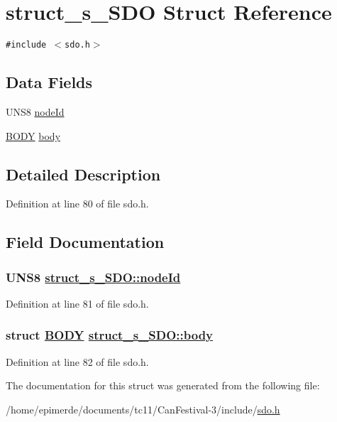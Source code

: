 \hypertarget{structstruct__s__SDO}{
\section{struct\_\-s\_\-SDO Struct Reference}
\label{structstruct__s__SDO}
}
{\tt \#include $<$sdo.h$>$}

\subsection*{Data Fields}
\begin{CompactItemize}
\item 
UNS8 \hyperlink{structstruct__s__SDO_bc72f84dbb51c6eb92ff44ac68e18ed5}{node\-Id}
\item 
\hyperlink{structBODY}{BODY} \hyperlink{structstruct__s__SDO_d24ba4940b125535e1d4e618fa6aa853}{body}
\end{CompactItemize}


\subsection{Detailed Description}




Definition at line 80 of file sdo.h.

\subsection{Field Documentation}
\hypertarget{structstruct__s__SDO_bc72f84dbb51c6eb92ff44ac68e18ed5}{
\subsubsection[nodeId]{\setlength{\rightskip}{0pt plus 5cm}UNS8 \hyperlink{structstruct__s__SDO_bc72f84dbb51c6eb92ff44ac68e18ed5}{struct\_\-s\_\-SDO::node\-Id}}}
\label{structstruct__s__SDO_bc72f84dbb51c6eb92ff44ac68e18ed5}




Definition at line 81 of file sdo.h.\hypertarget{structstruct__s__SDO_d24ba4940b125535e1d4e618fa6aa853}{
\subsubsection[body]{\setlength{\rightskip}{0pt plus 5cm}struct \hyperlink{structBODY}{BODY} \hyperlink{structstruct__s__SDO_d24ba4940b125535e1d4e618fa6aa853}{struct\_\-s\_\-SDO::body}}}
\label{structstruct__s__SDO_d24ba4940b125535e1d4e618fa6aa853}




Definition at line 82 of file sdo.h.

The documentation for this struct was generated from the following file:\begin{CompactItemize}
\item 
/home/epimerde/documents/tc11/Can\-Festival-3/include/\hyperlink{sdo_8h}{sdo.h}\end{CompactItemize}

